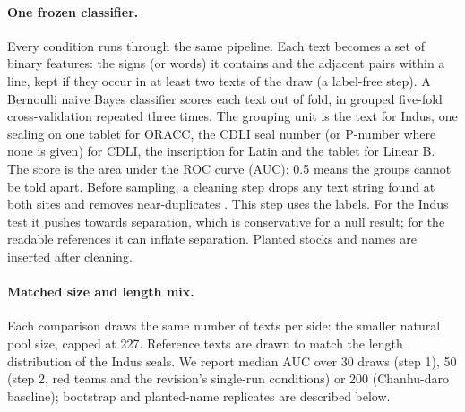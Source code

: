 \documentclass[11pt,a4paper]{article}
\begin{document}
\paragraph{One frozen classifier.} Every condition runs through the same pipeline.
Each text becomes a set of binary features: the signs (or words) it contains and the adjacent pairs within a line, kept if they occur in at least two texts of the draw (a label-free step). %
A Bernoulli naive Bayes classifier scores each text out of fold, in grouped five-fold cross-validation repeated three times. %
The grouping unit is the text for Indus, one sealing on one tablet for ORACC, the CDLI seal number (or P-number where none is given) for CDLI, the inscription for Latin and the tablet for Linear B. %
The score is the area under the ROC curve (AUC); 0.5 means the groups cannot be told apart.
Before sampling, a cleaning step drops any text string found at both sites and removes near-duplicates \citep{openindus2026corpus}.
This step uses the labels.
For the Indus test it pushes towards separation, which is conservative for a null result; for the readable references it can inflate separation.
Planted stocks and names are inserted after cleaning. %

\paragraph{Matched size and length mix.} Each comparison draws the same number of texts per side: the smaller natural pool size, capped at 227. %
Reference texts are drawn to match the length distribution of the Indus seals.
We report median AUC over 30 draws (step 1), 50 (step 2, red teams and the revision's single-run conditions) or 200 (Chanhu-daro baseline); bootstrap and planted-name replicates are described below. %
\end{document}
